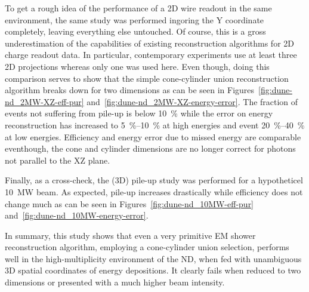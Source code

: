 To get a rough idea of the performance of a 2D wire readout in the same environment, the same study was performed ingoring the Y coordinate completely, leaving everything else untouched.
Of course, this is a gross underestimation of the capabilities of existing reconstruction algorithms for 2D charge readout data.
In particular, contemporary experiments use at least three 2D projections whereas only one was used here.
Even though, doing this comparison serves to show that the simple cone-cylinder union reconstruction algorithm breaks down for two dimensions as can be seen in Figures~\ref{fig:dune-nd_2MW-XZ-eff-pur} and~\ref{fig:dune-nd_2MW-XZ-energy-error}.
The fraction of events not suffering from pile-up is below \SI{10}{\percent} while the error on energy reconstruction has increased to \SIrange{5}{10}{\percent} at high energies and event \SIrange{20}{40}{\percent} at low energies.
Efficiency and energy error due to missed energy are comparable eventhough, the cone and cylinder dimensions are no longer correct for photons not parallel to the XZ plane.

Finally, as a cross-check, the (3D) pile-up study was performed for a hypotheticel \SI{10}{\mega\watt} beam.
As expected, pile-up increases drastically while efficiency does not change much as can be seen in Figures~\ref{fig:dune-nd_10MW-eff-pur} and~\ref{fig:dune-nd_10MW-energy-error}.

In summary, this study shows that even a very primitive EM shower reconstruction algorithm, employing a cone-cylinder union selection, performs well in the high-multiplicity environment of the \dune{} ND, when fed with unambiguous 3D spatial coordinates of energy depositions.
It clearly fails when reduced to two dimensions or presented with a much higher beam intensity.